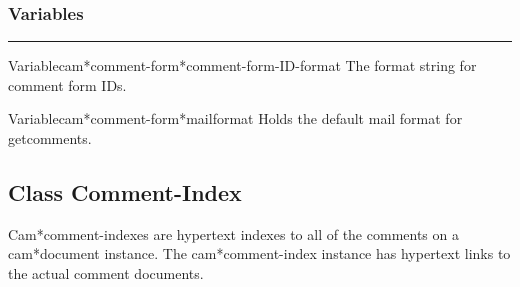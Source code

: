 \subsubsection*{Variables}
\par\vspace*{0.00in}\par\hrule\par\medskip\par


\begin{functiondoc}{Variable}{cam*comment-form*comment-form-ID-format}{}
The format string for comment form IDs.
\end{functiondoc}

\begin{functiondoc}{Variable}{cam*comment-form*mailformat}{}
Holds the default mail format for getcomments.
\end{functiondoc}


\clearpage

\subsection{Class Comment-Index}


Cam*comment-indexes are hypertext indexes to all of the comments on a
cam*document instance.  The cam*comment-index instance has hypertext links
to the actual comment documents.

